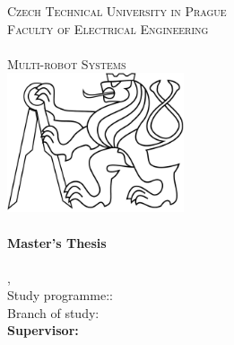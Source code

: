 
\begin{titlepage}
  \begin{center}

    \textsc{\Large Czech Technical University in Prague}\\[1em]
    \textsc{\large Faculty of Electrical Engineering\\
    \Department\\
    Multi-robot Systems\\[3em]
    }
    \includegraphics[height=4.1cm]{fig/ctu_lion.pdf}\\[3em]

    \textbf{\textsc{\Huge \Title}}\\[2em]

    \textbf{\Large Master's Thesis}\\[6em]

    \textbf{\huge \Author}\\[6em]

    {\large \Location, \Date}\\[3em]

    Study programme:: \Programme\\
    Branch of study: \Field\\[4em]

    \textbf{Supervisor: \Supervisor}\\

    \vspace{2pt}

  \end{center}
\end{titlepage}
